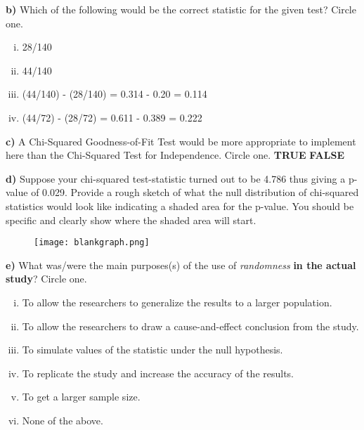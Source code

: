 \documentclass[12pt, oneside]{article}
\newcommand{\noi}{\noindent}
\begin{document}
\noi
{\bf b)} Which of the following would be the correct statistic for the given test? Circle one.
\begin{enumerate} [(i)]
\item 28/140
\item 44/140
\item (44/140) - (28/140) = 0.314 - 0.20 = 0.114
\item (44/72) - (28/72) = 0.611 - 0.389 = 0.222
\end{enumerate}
\vspace{.25in}

\noi
{\bf c)} A Chi-Squared Goodness-of-Fit Test would be more appropriate to implement here than the Chi-Squared Test for Independence. Circle one. \hspace{1.25in} {\bf TRUE} \hspace{1in} {\bf FALSE}\\
\vspace{.1in}

\noi
{\bf d)} Suppose your chi-squared test-statistic turned out to be 4.786 thus giving a p-value of 0.029. Provide a rough sketch of what the null distribution  of chi-squared statistics would look like indicating a shaded area for the p-value. You should be specific and clearly show where the shaded area will start.
\begin{figure}[h!]
\centering
\texttt{[image: blankgraph.png]}
\end{figure}
\vspace{.1in}

\pagebreak

\noi
{\bf e)} What was/were the main purposes(s) of the use of \emph{randomness} {\bf in the actual study}? Circle one.
\begin{enumerate} [(i)]
\item To allow the researchers to generalize the results to a larger population.
\item To allow the researchers to draw a cause-and-effect conclusion from the study.
\item To simulate values of the statistic under the null hypothesis.
\item To replicate the study and increase the accuracy of the results.
\item To get a larger sample size.
\item None of the above.
\end{enumerate}
\vspace{.1in}
\end{document}
